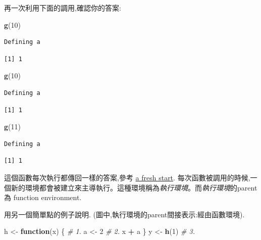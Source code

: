 \documentclass[]{book}
\newenvironment{Shaded}{\begin{snugshade}}{\end{snugshade}}
\newcommand{\CommentTok}[1]{\textcolor[rgb]{0.56,0.35,0.01}{\textit{#1}}}
\newcommand{\ControlFlowTok}[1]{\textcolor[rgb]{0.13,0.29,0.53}{\textbf{#1}}}
\newcommand{\DecValTok}[1]{\textcolor[rgb]{0.00,0.00,0.81}{#1}}
\newcommand{\KeywordTok}[1]{\textcolor[rgb]{0.13,0.29,0.53}{\textbf{#1}}}
\newcommand{\NormalTok}[1]{#1}
\newcommand{\OperatorTok}[1]{\textcolor[rgb]{0.81,0.36,0.00}{\textbf{#1}}}
\newcommand{\StringTok}[1]{\textcolor[rgb]{0.31,0.60,0.02}{#1}}
\theoremstyle{definition}
\theoremstyle{definition}
\theoremstyle{definition}
\theoremstyle{remark}
\begin{document}
再一次利用下面的調用,確認你的答案:

\begin{Shaded}
\begin{Highlighting}[]
\KeywordTok{g}\NormalTok{(}\DecValTok{10}\NormalTok{)}
\end{Highlighting}
\end{Shaded}

\begin{verbatim}
Defining a
\end{verbatim}

\begin{verbatim}
[1] 1
\end{verbatim}

\begin{Shaded}
\begin{Highlighting}[]
\KeywordTok{g}\NormalTok{(}\DecValTok{10}\NormalTok{)}
\end{Highlighting}
\end{Shaded}

\begin{verbatim}
Defining a
\end{verbatim}

\begin{verbatim}
[1] 1
\end{verbatim}

\begin{Shaded}
\begin{Highlighting}[]
\KeywordTok{g}\NormalTok{(}\DecValTok{11}\NormalTok{)}
\end{Highlighting}
\end{Shaded}

\begin{verbatim}
Defining a
\end{verbatim}

\begin{verbatim}
[1] 1
\end{verbatim}

這個函數每次執行都傳回一樣的答案,參考 \protect\hyperlink{fresh-start}{a
fresh start}.
每次函數被調用的時候,一個新的環境都會被建立來主導執行。這種環境稱為\emph{執行環境}。而\emph{執行環境}的parent為
function environment.

用另一個簡單點的例子說明. (圖中,執行環境的parent間接表示:經由函數環境).

\begin{Shaded}
\begin{Highlighting}[]
\NormalTok{h <-}\StringTok{ }\ControlFlowTok{function}\NormalTok{(x) \{}
  \CommentTok{# 1.}
\NormalTok{  a <-}\StringTok{ }\DecValTok{2} \CommentTok{# 2.}
\NormalTok{  x }\OperatorTok{+}\StringTok{ }\NormalTok{a}
\NormalTok{\}}
\NormalTok{y <-}\StringTok{ }\KeywordTok{h}\NormalTok{(}\DecValTok{1}\NormalTok{) }\CommentTok{# 3.}
\end{Highlighting}
\end{Shaded}
\end{document}
